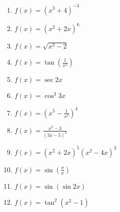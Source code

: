 \documentclass[12pt]{article}
\newif\ifans
\begin{document}
\begin{enumerate}

\item $f(x) = (x^3+4)^{-3}$ 

\ifans{\fbox{$-9x^2(x^3+4)^{-4}$}} \fi

\item $f(x) = (x^2+2x)^6$ 

\ifans{\fbox{$6(2x+2)(x^2+2x)^5$}} \fi

\item $f(x) = \sqrt{x^3-2}$ 

\ifans{\fbox{$\frac{3x^2}{2\sqrt{x^3-2}}$}} \fi

\item $f(x) = \tan{\left(\frac{1}{x^2}\right)}$ 

\ifans{\fbox{$-2x^{-3}\sec^2{\left(\frac{1}{x^2}\right)}$}} \fi

\item $f(x) = \sec{2x}$ 

\ifans{\fbox{$2\sec{(2x)}\tan{(2x)}$}} \fi

\item $f(x) = \cos^3{3x}$ 

\ifans{\fbox{$-9\sin{(3x)}\cos^2{(3x)}$}} \fi

\item $f(x) = \left(x^5-\frac{1}{x^2}\right)^4$ 

\ifans{\fbox{$4\left(x^5-\frac{1}{x^2}\right)^3\left(5x^4+\frac{2}{x^3}\right)$}} \fi

\item $f(x) = \frac{x^2-3}{(3x-5)^3}$ 

\ifans{\fbox{$\frac{2x}{(3x-5)^3}-\frac{9(x^2-3)}{(3x-5)^4}$}} \fi

\item $f(x) = (x^2+2x)^5(x^2-4x)^3$ 

\ifans{\fbox{$5(2x+2)(x^2+2x)^4(x^2-4x)^3+3(2x-4)(x^2-4x)^2(x^2+2x)^5$}} \fi

\item $f(x) = \sin {\left(\frac{\pi}{x}\right)}$ 

\ifans{\fbox{$-\pi x^{-2}\cos{\left(\frac{\pi}{x}\right)}$}} \fi

\item $f(x) = \sin{(\sin{2x})}$ 

\ifans{\fbox{$2\cos{(\sin{2x})}\cos{2x}$}} \fi

\item $f(x) = \tan^2{(x^2-1)}$ 

\ifans{\fbox{$4x\tan{(x^2-1)}\sec^2{(x^2-1)}$}} \fi


\end{enumerate}
\end{document}
